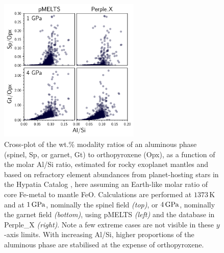 \documentclass[times]{oupau}
\begin{document}
\begin{figure}[!h]
         \centering
         \includegraphics[width=0.6\textwidth]{figs/crossplot_al_opx.pdf}
        \caption{Cross-plot of the wt.\% modality ratios of an aluminous phase (spinel, Sp, or garnet, Gt) to orthopyroxene (Opx), as a function of the molar Al/Si ratio, estimated for rocky exoplanet mantles and based on refractory element abundances from planet-hosting stars in the Hypatia Catalog \citep{hinkel_stellar_2014}, here assuming an Earth-like molar ratio of core Fe-metal to mantle FeO. Calculations are performed at $1373\,\text{K}$ and at $1\,{\rm GPa}$, nominally the spinel field \textit{(top)}, or $4\,{\rm GPa}$, nominally the garnet field \textit{(bottom)}, using pMELTS \textit{(left)} and the \citet{jennings_simple_2015} database in Perple\_X \textit{(right)}. Note a few extreme cases are not visible in these $y$-axis limits. With increasing Al/Si, higher proportions of the aluminous phase are stabilised at the expense of orthopyroxene.}
        \label{fig:alsi_opx}
\end{figure}
\clearpage



\end{document}
